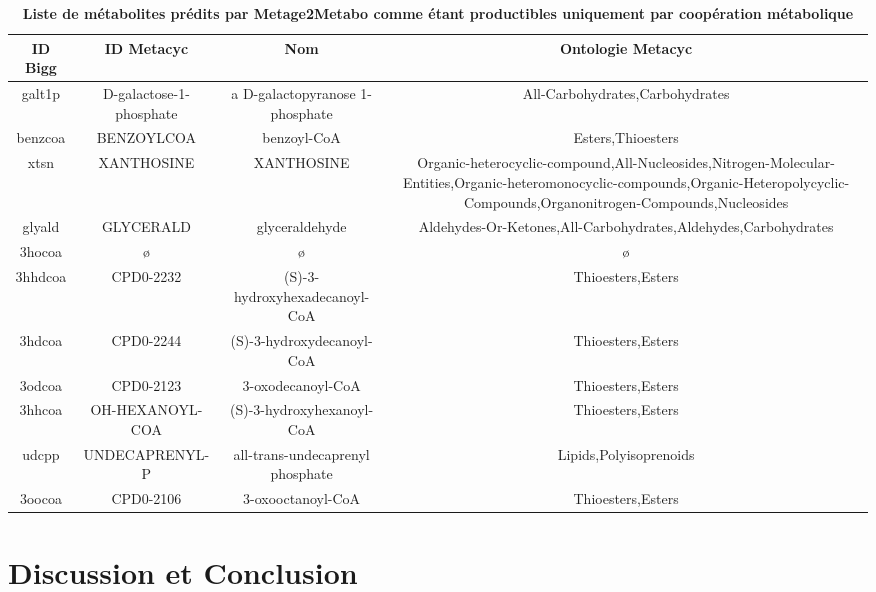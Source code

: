 \begin{table}[H]
\centering
\begin{adjustbox}{width=\textwidth}
\begin{tabular}{|c|c|c|c|}
\hline
ID Bigg & ID Metacyc & Nom & Ontologie Metacyc  \\
\hline
galt1p&	D-galactose-1-phosphate&	a D-galactopyranose 1-phosphate	&All-Carbohydrates,Carbohydrates\\
benzcoa&	BENZOYLCOA&	benzoyl-CoA&	Esters,Thioesters\\
xtsn&	XANTHOSINE&	XANTHOSINE	&\begin{minipage}[t]{0.8\linewidth}Organic-heterocyclic-compound,All-Nucleosides,Nitrogen-Molecular-Entities,Organic-heteromonocyclic-compounds,Organic-Heteropolycyclic-Compounds,Organonitrogen-Compounds,Nucleosides\end{minipage}\\
glyald&	GLYCERALD&	glyceraldehyde	&Aldehydes-Or-Ketones,All-Carbohydrates,Aldehydes,Carbohydrates\\
3hocoa&	ø	&	ø	&	ø\\
3hhdcoa	&CPD0-2232	&(S)-3-hydroxyhexadecanoyl-CoA	&Thioesters,Esters\\
3hdcoa&	CPD0-2244	&(S)-3-hydroxydecanoyl-CoA	&Thioesters,Esters\\
3odcoa&	CPD0-2123&	3-oxodecanoyl-CoA	&Thioesters,Esters\\
3hhcoa&	OH-HEXANOYL-COA	&(S)-3-hydroxyhexanoyl-CoA&	Thioesters,Esters\\
udcpp&	UNDECAPRENYL-P	&all-trans-undecaprenyl phosphate	&Lipids,Polyisoprenoids\\
3oocoa&	CPD0-2106&	3-oxooctanoyl-CoA	&Thioesters,Esters\\
 \hline
\end{tabular}
\end{adjustbox}
\caption{\textbf{Liste de métabolites prédits par Metage2Metabo comme étant productibles uniquement par coopération métabolique}}
\label{table:added-value-M2M}
\end{table}

\section{Discussion et Conclusion}

